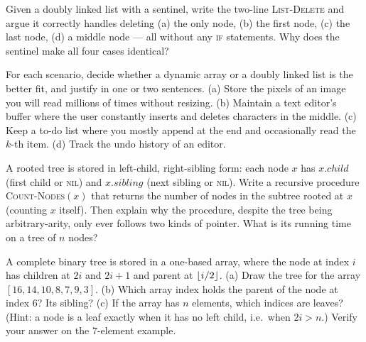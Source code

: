 \begin{exercise}
\label{ch10:ex-delete}
Given a doubly linked list with a sentinel, write the two-line \textsc{List-Delete} and argue it correctly handles deleting (a) the only node, (b) the first node, (c) the last node, (d) a middle node --- all without any \textsc{if} statements. Why does the sentinel make all four cases identical?
\end{exercise}

\begin{exercise}
\label{ch10:ex-vs}
For each scenario, decide whether a dynamic array or a doubly linked list is the better fit, and justify in one or two sentences. (a) Store the pixels of an image you will read millions of times without resizing. (b) Maintain a text editor's buffer where the user constantly inserts and deletes characters in the middle. (c) Keep a to-do list where you mostly append at the end and occasionally read the $k$-th item. (d) Track the undo history of an editor.
\end{exercise}

\begin{exercise}
\label{ch10:ex-lcrs}
A rooted tree is stored in left-child, right-sibling form: each node $x$ has $x.child$ (first child or \textsc{nil}) and $x.sibling$ (next sibling or \textsc{nil}). Write a recursive procedure \textsc{Count-Nodes}$(x)$ that returns the number of nodes in the subtree rooted at $x$ (counting $x$ itself). Then explain why the procedure, despite the tree being arbitrary-arity, only ever follows two kinds of pointer. What is its running time on a tree of $n$ nodes?
\end{exercise}

\begin{exercise}
\label{ch10:ex-heaparray}
A complete binary tree is stored in a one-based array, where the node at index $i$ has children at $2i$ and $2i+1$ and parent at $\lfloor i/2\rfloor$. (a) Draw the tree for the array $[16, 14, 10, 8, 7, 9, 3]$. (b) Which array index holds the parent of the node at index $6$? Its sibling? (c) If the array has $n$ elements, which indices are leaves? (Hint: a node is a leaf exactly when it has no left child, i.e.\ when $2i > n$.) Verify your answer on the $7$-element example.
\end{exercise}
